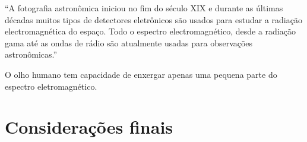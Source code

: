 \documentclass[
	article,			%
	12pt,				%
	oneside,			%
	a4paper,			%
	english,			%
	brazil,				%
	sumario=tradicional
	]{abntex2}
\begin{document}
``A fotografia astronômica iniciou no fim do século XIX e durante as últimas 
décadas muitos tipos de detectores eletrônicos são usados para estudar a
radiação electromagnética do espaço. Todo o espectro electromagnético, desde a 
radiação gama até as ondas de rádio são atualmente usadas para observações 
astronômicas.'' \cite{fotometria}

O olho humano tem capacidade de enxergar apenas uma pequena parte do espectro
eletromagnético.

% 

\section{Considerações finais}

\lipsum[1]

\begin{citacao}
\lipsum[2]
\end{citacao}

\lipsum[3]
\newpage
\postextual{}


\end{document}
